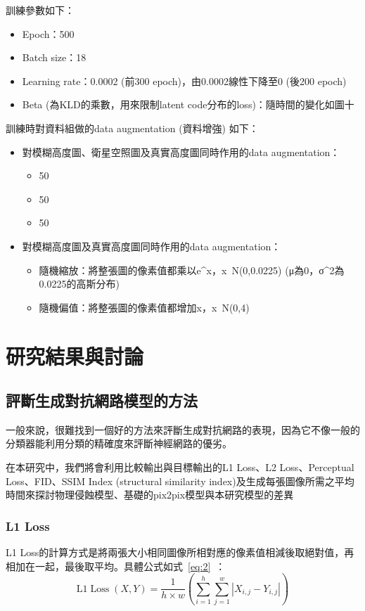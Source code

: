 \documentclass[a4paper, 12pt]{article}
\begin{document}
訓練參數如下：
\begin{itemize}
\item Epoch：500
\item Batch size：18
\item Learning rate：0.0002 (前300 epoch)，由0.0002線性下降至0 (後200 epoch)
\item Beta (為KLD的乘數，用來限制latent code分布的loss)：隨時間的變化如圖十
\end{itemize}
	
訓練時對資料組做的data augmentation (資料增強) 如下：
\begin{itemize}
\item 對模糊高度圖、衛星空照圖及真實高度圖同時作用的data augmentation：
	\begin{itemize}
		\item 50%
		\item 50%
		\item 50%
	\end{itemize}
	\item 對模糊高度圖及真實高度圖同時作用的data augmentation：
	\begin{itemize}
		\item 隨機縮放：將整張圖的像素值都乘以e^x，x~N(0,0.0225) (μ為0，σ^2為0.0225的高斯分布)
		\item 隨機偏值：將整張圖的像素值都增加x，x~N(0,4)
	\end{itemize}
\end{itemize}



\section{研究結果與討論}
\label{sec:res}
\subsection{評斷生成對抗網路模型的方法}
一般來說，很難找到一個好的方法來評斷生成對抗網路的表現，因為它不像一般的分類器能利用分類的精確度來評斷神經網路的優劣。

在本研究中，我們將會利用比較輸出與目標輸出的L1 Loss、L2 Loss、Perceptual Loss、FID、SSIM Index (structural similarity index)及生成每張圖像所需之平均時間來探討物理侵蝕模型、基礎的pix2pix模型與本研究模型的差異

\subsubsection{L1 Loss}
L1 Loss的計算方式是將兩張大小相同圖像所相對應的像素值相減後取絕對值，再相加在一起，最後取平均。具體公式如式~\ref{eq:2}~：
\begin{equation}
    \mathrm{L} 1 \operatorname{Loss}(X, Y)=\frac{1}{h \times w}\left(\sum_{i=1}^{h} \sum_{j=1}^{w}\left|X_{i, j}-Y_{i, j}\right|\right)
    \label{eq:2}
\end{equation}
\end{document}
